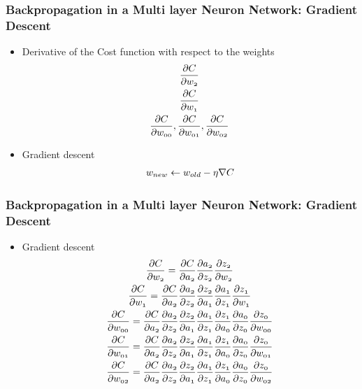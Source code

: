 \documentclass{beamer}
\newcommand{\var}[1]{\mathnormal{#1}}
\begin{document}
\begin{frame}
  \frametitle{Backpropagation in a Multi layer Neuron Network: Gradient Descent}
  \begin{itemize}
    \item Derivative of the Cost function with respect to the weights
    \begin{gather}
      \var{\frac{\partial C}{\partial w_2}} \\
      \var{\frac{\partial C}{\partial w_1}} \\
      \var{\frac{\partial C}{\partial w_{00}}}, \var{\frac{\partial C}{\partial w_{01}}}, \var{\frac{\partial C}{\partial w_{02}}}
    \end{gather}
    \item Gradient descent
    \begin{gather}
      \var{w}_{\var{new}} \leftarrow \var{w}_{\var{old}} - \eta \nabla C
    \end{gather}
  \end{itemize}
\end{frame}

\begin{frame}
  \frametitle{Backpropagation in a Multi layer Neuron Network: Gradient Descent}
  \begin{itemize}
    \item Gradient descent
    \begin{gather}
        \var{\frac{\partial C}{\partial w_2}} = \var{\frac{\partial C}{\partial a_2}} \var{\frac{\partial a_2}{\partial z_2}} \var{\frac{\partial z_2}{\partial w_2}} \\
        \var{\frac{\partial C}{\partial w_1}} = \var{\frac{\partial C}{\partial a_2}} \var{\frac{\partial a_2}{\partial z_2}} \var{\frac{\partial z_2}{\partial a_1}} \var{\frac{\partial a_1}{\partial z_1}} \var{\frac{\partial z_1}{\partial w_1}} \\
        \var{\frac{\partial C}{\partial w_{00}}} = \var{\frac{\partial C}{\partial a_2}} \var{\frac{\partial a_2}{\partial z_2}} \var{\frac{\partial z_2}{\partial a_1}} \var{\frac{\partial a_1}{\partial z_1}} \var{\frac{\partial z_1}{\partial a_{0}}} \var{\frac{\partial a_{0}}{\partial z_{0}}} \var{\frac{\partial z_{0}}{\partial w_{00}}} \\
        \var{\frac{\partial C}{\partial w_{01}}} = \var{\frac{\partial C}{\partial a_2}} \var{\frac{\partial a_2}{\partial z_2}} \var{\frac{\partial z_2}{\partial a_1}} \var{\frac{\partial a_1}{\partial z_1}} \var{\frac{\partial z_1}{\partial a_{0}}} \var{\frac{\partial a_{0}}{\partial z_{0}}} \var{\frac{\partial z_{0}}{\partial w_{01}}} \\
        \var{\frac{\partial C}{\partial w_{02}}} = \var{\frac{\partial C}{\partial a_2}} \var{\frac{\partial a_2}{\partial z_2}} \var{\frac{\partial z_2}{\partial a_1}} \var{\frac{\partial a_1}{\partial z_1}} \var{\frac{\partial z_1}{\partial a_{0}}} \var{\frac{\partial a_{0}}{\partial z_{0}}} \var{\frac{\partial z_{0}}{\partial w_{02}}}
    \end{gather}
  \end{itemize}
\end{frame}
\end{document}
